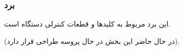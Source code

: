 \documentclass[a4paper,12pt]{report}
\begin{document}
	\pagebreak
	\subsubsection{
		برد
	}\label{subsubsec3:subsec2:sec3:chap2}
	این برد مربوط به کلید‌ها و قطعات کنترلی دستگاه است.

	\danger
	(در حال حاضر این بخش در حال پروسه طراحی قرار دارد).

%	
%	
\end{document}
